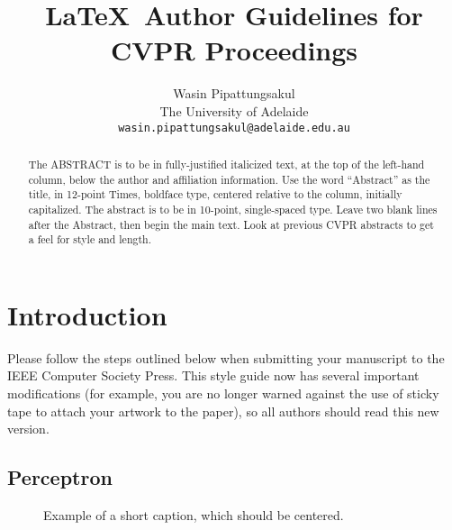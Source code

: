\documentclass[10pt,twocolumn,letterpaper]{article}
\begin{document}
\title{\LaTeX\ Author Guidelines for CVPR Proceedings}

\author{Wasin Pipattungsakul \\
The University of Adelaide \\
{\tt\small wasin.pipattungsakul@adelaide.edu.au}
}

\maketitle

\begin{abstract}
   The ABSTRACT is to be in fully-justified italicized text, at the top
   of the left-hand column, below the author and affiliation
   information. Use the word ``Abstract'' as the title, in 12-point
   Times, boldface type, centered relative to the column, initially
   capitalized. The abstract is to be in 10-point, single-spaced type.
   Leave two blank lines after the Abstract, then begin the main text.
   Look at previous CVPR abstracts to get a feel for style and length.
\end{abstract}

\section{Introduction}

Please \citep{gu-2021} follow the steps outlined below when submitting your manuscript to
the IEEE Computer Society Press.  This style guide now has several
important modifications (for example, you are no longer warned against the
use of sticky tape to attach your artwork to the paper), so all authors
should read this new version.

\subsection{Perceptron}

\noindent

\begin{figure*}
\begin{center}
\fbox{\rule{0pt}{2in} \rule{.9\linewidth}{0pt}}
\end{center}
   \caption{Example of a short caption, which should be centered.}
\label{fig:short}
\end{figure*}

\end{document}
